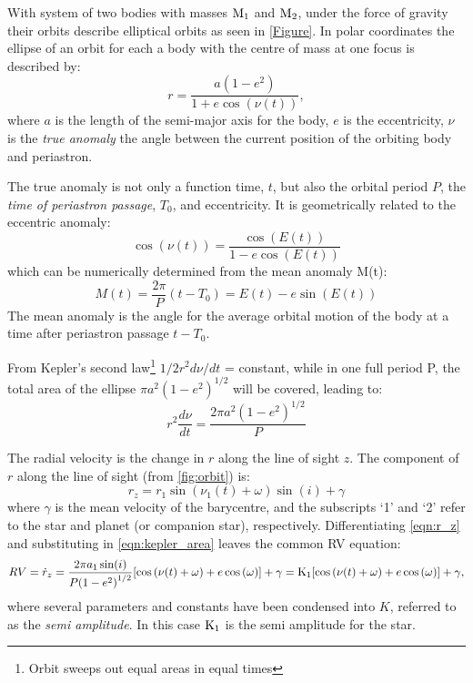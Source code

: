 With system of two bodies with masses $\textrm{M}_{1}$ and $\textrm{M}_{2}$, under the force of gravity their orbits describe elliptical orbits as seen in \cref{Figure}. In polar coordinates the ellipse of an orbit for each a body with the centre of mass at one focus is described by:
\begin{equation}
    r = \frac{a(1-e^{2})}{1 + e \cos(\nu(t))},
\end{equation}
where $a$ is the length of the semi-major axis for the body, $e$ is the eccentricity, $\nu$ is the \emph{true anomaly} the angle between the current position of the orbiting body and periastron.

The true anomaly is not only a function time, \(t\), but also the orbital period \(P\), the \emph{time of periastron passage}, \(T_0\), and eccentricity. It is geometrically related to the eccentric anomaly:
\begin{equation}
\cos(\nu(t)) = \frac{\cos(E(t))}{1 - e \cos(E(t))}
\end{equation} 
which can be numerically determined from the mean anomaly M(t):
\begin{equation}
M(t) = \frac{2 \pi}{P}(t - T_0) = E(t) - e \sin(E(t))
\end{equation}
The mean anomaly is the angle for the average orbital motion of the body at a time after periastron passage \(t-T_0\).


From Kepler's second law\footnote{Orbit sweeps out equal areas in equal times} \(1/2 r^{2} d\nu/dt\) = constant, while in one full period P, the total area of the ellipse \(\pi a^{2}{(1 - e^{2})}^{1/2} \) will be covered, leading to: 
\begin{equation}
r^2 \frac{d\nu}{dt} = \frac{2\pi a^{2}(1-e^{2})^{1/2}}{P} \label{eqn:kepler_area}
\end{equation}

The radial velocity is the change in $r$ along the line of sight $z$. The component of $r$ along the line of sight (from \cref{fig:orbit}) is:
\begin{equation}
   r_z =  r_1 \sin(\nu_1(t) + \omega)\sin(i) + \gamma \label{eqn:r_z}
\end{equation}
where $\gamma$ is the mean velocity of the barycentre, and the subscripts `1' and `2' refer to the star and planet (or companion star), respectively.
Differentiating \cref{eqn:r_z} and substituting in \cref{eqn:kepler_area} leaves the common RV equation:
\begin{equation}
\label{eqn:rv_equation}
{RV} = \dot{r}_z= \frac{2 \pi a_1 \sin(i)}{P{(1-e^{2})}^{1/2}} [\cos{(\nu(t) + \omega)} + e\cos{(\omega)}] + \gamma
     = \textrm{K}_{1} [\cos{(\nu(t) + \omega)} + e\cos{(\omega)}] + \gamma,
\end{equation}
where several parameters and constants have been condensed into $K$, referred to as the \emph{semi amplitude}. In this case $\textrm{K}_{1}$ is the semi amplitude for the star.


